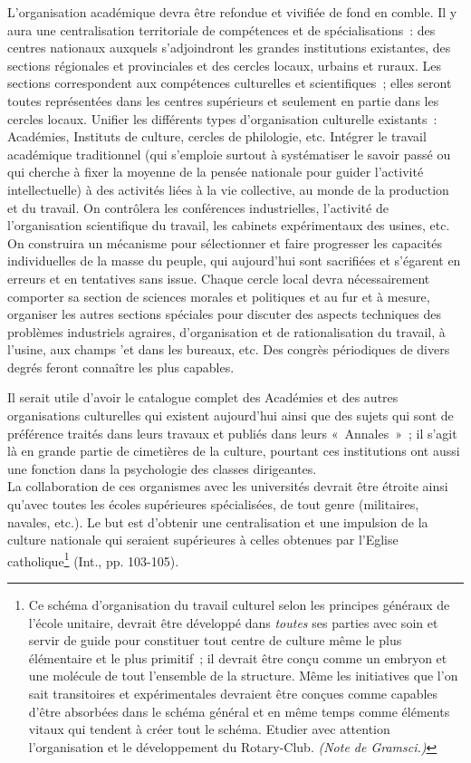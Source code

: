 \documentclass[french,twoside]{book} %
\begin{document}
L'organisation académique devra être refondue et vivifiée de fond en comble. Il y aura une centralisation territoriale de compétences et de spécialisations : des centres nationaux auxquels s’adjoindront les grandes institutions existantes, des sections régionales et provinciales et des cercles locaux, urbains et ruraux. Les sections correspondent aux compétences culturelles et scientifiques ; elles seront toutes représentées dans les centres supérieurs et seulement en partie dans les cercles locaux. Unifier les différents types d’organisation culturelle existants : Académies, Instituts de culture, cercles de philologie, etc. Intégrer le travail académique traditionnel (qui s’emploie surtout à systématiser le savoir passé ou qui cherche à fixer la moyenne de la pensée nationale pour guider l’activité intellectuelle) à des activités liées à la vie collective, au monde de la production et du travail. On contrôlera les conférences industrielles, l’activité de l’organisation scientifique du travail, les cabinets expérimentaux des usines, etc. On construira un mécanisme pour sélectionner et faire progresser les capacités individuelles de la masse du peuple, qui aujourd’hui sont sacrifiées et s’égarent en erreurs et en tentatives sans issue. Chaque cercle local devra nécessairement comporter sa section de sciences morales et politiques et au fur et à mesure, organiser les autres sections spéciales pour discuter des aspects techniques des problèmes industriels agraires, d’organisation et de rationalisation du travail, à l’usine, aux champs 'et dans les bureaux, etc. Des congrès périodiques de divers degrés feront connaître les plus capables.\par
Il serait utile d’avoir le catalogue complet des Académies et des autres organisations culturelles qui existent aujourd’hui ainsi que des sujets qui sont de préférence traités dans leurs travaux et publiés dans leurs « Annales » ; il s’agit là en grande partie de cimetières de la culture, pourtant ces institutions ont aussi une fonction dans la psychologie des classes dirigeantes. \\
La collaboration de ces organismes avec les universités devrait être étroite ainsi qu’avec toutes les écoles supérieures spécialisées, de tout genre (militaires, navales, etc.). Le but est d’obtenir une centralisation et une impulsion de la culture nationale qui seraient supérieures à celles obtenues par l’Eglise catholique\footnote{Ce schéma d’organisation du travail culturel selon les principes généraux de l’école unitaire, devrait être développé dans \emph{toutes} ses parties avec soin et servir de guide pour constituer tout centre de culture même le plus élémentaire et le plus primitif ; il devrait être conçu comme un embryon et une molécule de tout l’ensemble de la structure. Même les initiatives que l’on sait transitoires et expérimentales devraient être conçues comme capables d’être absorbées dans le schéma général et en même temps comme éléments vitaux qui tendent à créer tout le schéma. Etudier avec attention l’organisation et le développement du Rotary-Club. \emph{(Note de Gramsci.)}} (Int., pp. 103-105).\par
{\raggedleft \noindent [1930]}
\end{document}
